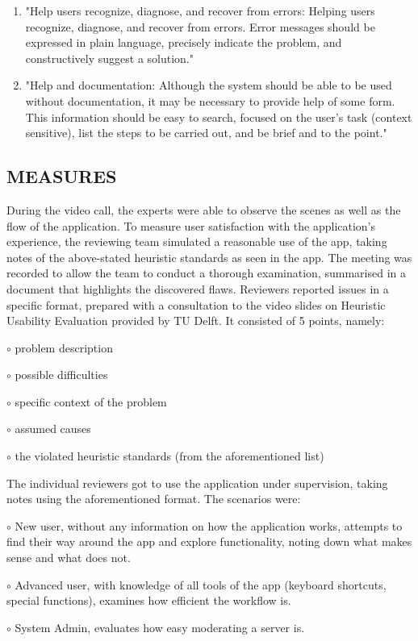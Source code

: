 \begin{enumerate}
\item "Help users recognize, diagnose, and recover from errors: Helping users recognize, diagnose, and recover from errors. Error messages should be expressed in plain language, precisely indicate the problem, and constructively suggest a solution."

\item "Help and documentation: Although the system should be able to be used without documentation, it may be necessary to provide help of some form. This information should be easy to search, focused on the user’s task (context sensitive), list the  steps to be carried out, and be brief and to the point."

\end{enumerate}


\subsection{MEASURES}

During the video call, the experts were able to observe the scenes as well as the flow of the application. To measure user satisfaction with the application’s experience, the reviewing team simulated a reasonable use of the app, taking notes of the above-stated heuristic standards as seen in the app. The meeting was recorded to allow the team to conduct a thorough examination, summarised in a document that highlights the discovered flaws. Reviewers reported issues in a specific format, prepared with a consultation to the video slides on Heuristic Usability Evaluation provided by TU Delft. It consisted of 5 points, namely:

\noindent\( \circ \) problem description 

\noindent\( \circ \) possible difficulties

\noindent\( \circ \) specific context of the problem 

\noindent\( \circ \) assumed causes

\noindent\( \circ \) the violated heuristic standards (from the aforementioned list)

The individual reviewers got to use the application under supervision, taking notes using the aforementioned format. The scenarios were:

\noindent\( \circ \) New user, without any information on how the application works, attempts to find their way around the app and explore functionality, noting down what makes sense and what does not.

\noindent\( \circ \) Advanced user, with knowledge of all tools of the app (keyboard shortcuts, special functions), examines how efficient the workflow is.

\noindent\( \circ \) System Admin, evaluates how easy moderating a server is.

